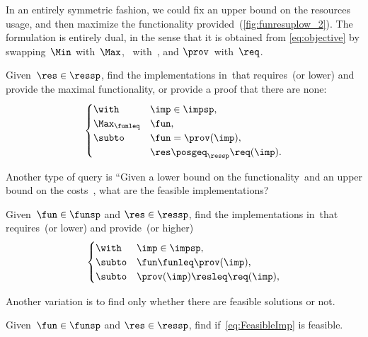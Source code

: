 In an entirely symmetric fashion, we could fix an upper bound on the resources usage, and then maximize the functionality provided~(\cref{fig:funresuplow_2}).
The formulation is entirely dual, in the sense that it is obtained from \cref{eq:objective} by swapping~$\Min$ with~$\Max$, \funsp~with~\ressp,
and $\prov$~with~$\req$.

\begin{problem}[\FixResMaxFun]
    \label{prob:FixResMaxFun}
    Given~$\res\in\ressp$, find the implementations in~\impsp that requires~\res (or lower) and provide the maximal functionality, or provide a proof that there are none:
    \begin{equation}
        \begin{cases}
            \with & \imp\in\impsp,\\
            \Max_{\funleq} & \fun,\\
            \subto & \fun=\prov(\imp),\\
            & \res\posgeq_{\ressp}\req(\imp).
        \end{cases}\label{eq:objective-1}
    \end{equation}
\end{problem}


\begin{figure*}
    \centering
    \caption{}
    \label{fig:funresuplow_2}
\end{figure*}


Another type of query is
``Given a lower bound on the functionality~\fun and an upper bound on the costs~\fun, what are the feasible implementations?


\begin{problem}[\FeasibleImp]
    \label{prob:FeasibleImp}
    Given~$\fun\in\funsp$ and $\res\in\ressp$, find the implementations in~\impsp that requires~\res (or lower) and provide~\fun (or higher)
    \begin{equation}
        \label{eq:FeasibleImp}
        \begin{cases}
            \with & \imp\in\impsp,\\
            \subto & \fun \funleq \prov(\imp),\\
            \subto &  \prov(\imp) \resleq \req(\imp) ,\\
        \end{cases}
    \end{equation}
\end{problem}

Another variation is to find only whether there are feasible solutions or not.

\begin{problem}[\Feasibility]
    \label{prob:Feasibility}
    Given~$\fun\in\funsp$ and $\res\in\ressp$, find if~\cref{eq:FeasibleImp} is feasible.
\end{problem}
